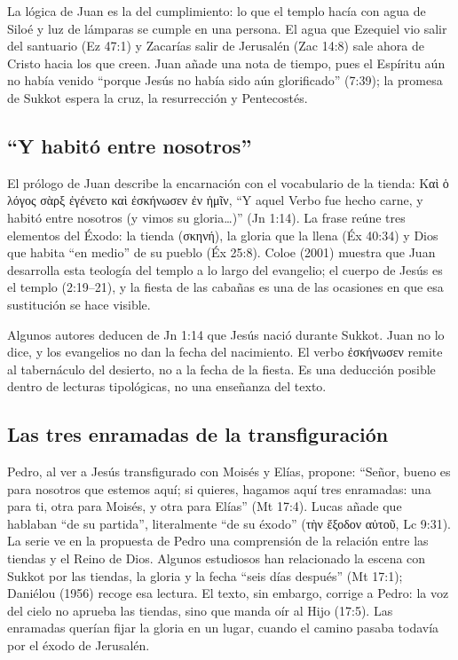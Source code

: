 \documentclass[11pt,letterpaper]{article}
\newcommand{\grc}[1]{\foreignlanguage{ancientgreek}{#1}}
\begin{document}
La lógica de Juan es la del cumplimiento: lo que el templo hacía con agua de Siloé y luz de lámparas se cumple en una persona. El agua que Ezequiel vio salir del santuario (Ez 47:1) y Zacarías salir de Jerusalén (Zac 14:8) sale ahora de Cristo hacia los que creen. Juan añade una nota de tiempo, pues el Espíritu aún no había venido ``porque Jesús no había sido aún glorificado'' (7:39); la promesa de Sukkot espera la cruz, la resurrección y Pentecostés.

\subsection{``Y habitó entre nosotros''}
El prólogo de Juan describe la encarnación con el vocabulario de la tienda: \grc{Καὶ ὁ λόγος σὰρξ ἐγένετο καὶ ἐσκήνωσεν ἐν ἡμῖν}, ``Y aquel Verbo fue hecho carne, y habitó entre nosotros (y vimos su gloria\ldots)'' (Jn 1:14). La frase reúne tres elementos del Éxodo: la tienda (\grc{σκηνή}), la gloria que la llena (Éx 40:34) y Dios que habita ``en medio'' de su pueblo (Éx 25:8). Coloe (2001) muestra que Juan desarrolla esta teología del templo a lo largo del evangelio; el cuerpo de Jesús es el templo (2:19--21), y la fiesta de las cabañas es una de las ocasiones en que esa sustitución se hace visible.

\begin{nota}[Precisión]
Algunos autores deducen de Jn 1:14 que Jesús nació durante Sukkot. Juan no lo dice, y los evangelios no dan la fecha del nacimiento. El verbo \grc{ἐσκήνωσεν} remite al tabernáculo del desierto, no a la fecha de la fiesta. Es una deducción posible dentro de lecturas tipológicas, no una enseñanza del texto.
\end{nota}

\subsection{Las tres enramadas de la transfiguración}
Pedro, al ver a Jesús transfigurado con Moisés y Elías, propone: ``Señor, bueno es para nosotros que estemos aquí; si quieres, hagamos aquí tres enramadas: una para ti, otra para Moisés, y otra para Elías'' (Mt 17:4). Lucas añade que hablaban ``de su partida'', literalmente ``de su éxodo'' (\grc{τὴν ἔξοδον αὐτοῦ}, Lc 9:31). La serie ve en la propuesta de Pedro una comprensión de la relación entre las tiendas y el Reino de Dios. Algunos estudiosos han relacionado la escena con Sukkot por las tiendas, la gloria y la fecha ``seis días después'' (Mt 17:1); Daniélou (1956) recoge esa lectura. El texto, sin embargo, corrige a Pedro: la voz del cielo no aprueba las tiendas, sino que manda oír al Hijo (17:5). Las enramadas querían fijar la gloria en un lugar, cuando el camino pasaba todavía por el éxodo de Jerusalén.
\end{document}
